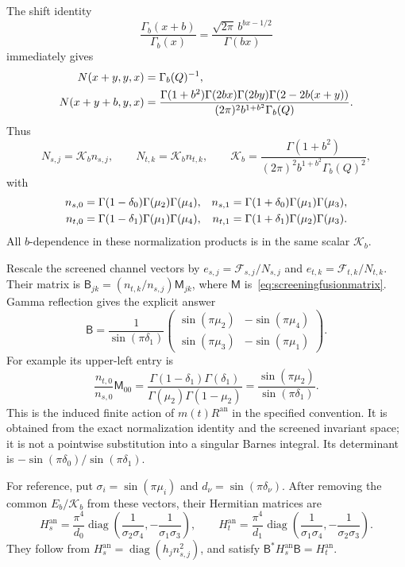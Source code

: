 \documentclass[11pt,a4paper]{article}
\numberwithin{equation}{section}
\theoremstyle{definition}
\theoremstyle{remark}
\DeclareMathOperator{\diag}{diag}
\begin{document}
The shift identity
\[
 \frac{\Gamma_b(x+b)}{\Gamma_b(x)}
       =\frac{\sqrt{2\pi}\,b^{bx-1/2}}{\Gamma(bx)}
\]
immediately gives
\begin{align}
 N(x+y,y,x)&=\Gamma_b(Q)^{-1},\notag\\
 N(x+y+b,y,x)&=
 \frac{\Gamma(1+b^2)\Gamma(2bx)\Gamma(2by)
                 \Gamma(2-2b(x+y))}
      {(2\pi)^2b^{1+b^2}\Gamma_b(Q)}.
 \label{eq:TVscreeningN}
\end{align}
Thus
\[
 N_{s,j}=\mathcal K_b n_{s,j},\qquad
 N_{t,k}=\mathcal K_b n_{t,k},\qquad
 \mathcal K_b=
 \frac{\Gamma(1+b^2)}
      {(2\pi)^2b^{1+b^2}\Gamma_b(Q)^2},
\]
with
\begin{align}
 n_{s,0}&=\Gamma(1-\delta_0)\Gamma(\mu_2)\Gamma(\mu_4),
 &n_{s,1}&=\Gamma(1+\delta_0)\Gamma(\mu_1)\Gamma(\mu_3),
 \notag\\
 n_{t,0}&=\Gamma(1-\delta_1)\Gamma(\mu_1)\Gamma(\mu_4),
 &n_{t,1}&=\Gamma(1+\delta_1)\Gamma(\mu_2)\Gamma(\mu_3).
 \label{eq:TVfiniteN}
\end{align}
All $b$-dependence in these normalization products is in the
same scalar $\mathcal K_b$.

Rescale the screened channel vectors by
$e_{s,j}=\mathcal F_{s,j}/N_{s,j}$ and
$e_{t,k}=\mathcal F_{t,k}/N_{t,k}$. Their matrix is
$\mathsf B_{jk}=(n_{t,k}/n_{s,j})\mathsf M_{jk}$, where
$\mathsf M$ is~\eqref{eq:screeningfusionmatrix}. Gamma reflection
gives the explicit answer
\begin{equation}
 \boxed{\quad
 \mathsf B=
 \frac1{\sin(\pi\delta_1)}
 \begin{pmatrix}
 \sin(\pi\mu_2)&-\sin(\pi\mu_4)\\
 \sin(\pi\mu_3)&-\sin(\pi\mu_1)
 \end{pmatrix}.
 \quad}
 \label{eq:analytic6jscreening}
\end{equation}
For example its upper-left entry is
\[
 \frac{n_{t,0}}{n_{s,0}}\mathsf M_{00}
 =\frac{\Gamma(1-\delta_1)\Gamma(\delta_1)}
        {\Gamma(\mu_2)\Gamma(1-\mu_2)}
 =\frac{\sin(\pi\mu_2)}{\sin(\pi\delta_1)}.
\]
This is the induced finite action of $m(t)R^{\mathrm{an}}$
in the specified convention. It is obtained from the exact
normalization identity and the screened invariant space;
it is not a pointwise substitution into a singular Barnes
integral. Its determinant is
$-\sin(\pi\delta_0)/\sin(\pi\delta_1)$.

For reference, put
$\sigma_i=\sin(\pi\mu_i)$ and
$d_\nu=\sin(\pi\delta_\nu)$. After removing the common
$E_b/\mathcal K_b$ from these vectors, their Hermitian matrices
are
\begin{equation}
 H_s^{\mathrm{an}}=
 \frac{\pi^4}{d_0}
 \diag\left(\frac1{\sigma_2\sigma_4},
            -\frac1{\sigma_1\sigma_3}\right),\qquad
 H_t^{\mathrm{an}}=
 \frac{\pi^4}{d_1}
 \diag\left(\frac1{\sigma_1\sigma_4},
            -\frac1{\sigma_2\sigma_3}\right).
 \label{eq:analytic6jpairing}
\end{equation}
They follow from $H_s^{\mathrm{an}}=\diag(h_jn_{s,j}^2)$,
and satisfy $\mathsf B^*H_s^{\mathrm{an}}\mathsf B
=H_t^{\mathrm{an}}$.
\end{document}
